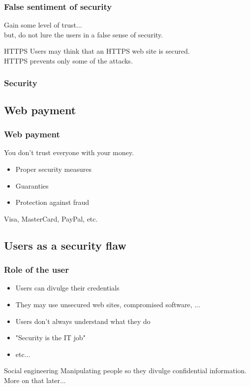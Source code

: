 \begin{frame}
\frametitle{False sentiment of security}
Gain some level of trust...
\\ but, do not lure the users in a false sense of security.
\begin{exampleblock}{HTTPS}
Users may think that an HTTPS web site is secured.
\\ HTTPS prevents only some of the attacks.
\end{exampleblock}
\end{frame}

\begin{frame}
\frametitle{Security}
\end{frame}

\subsection{Web payment}

\begin{frame}
\frametitle{Web payment}
\begin{center}
You don't trust everyone with your money.
\end{center}
\begin{itemize}
\item Proper security measures
\item Guaranties
\item Protection against fraud
\end{itemize}
\begin{example}
Visa, MasterCard, PayPal, etc.
\end{example}
\end{frame}

\subsection{Users as a security flaw}

\begin{frame}
\frametitle{Role of the user}
\begin{itemize}
\item Users can divulge their credentials
\item They may use unsecured web sites, compromised software, ...
\item Users don't always understand what they do
\item "Security is the IT job"
\item etc...
\end{itemize}
\begin{block}{Social engineering}
Manipulating people so they divulge confidential information.
\\ More on that later...
\end{block}
\end{frame}

